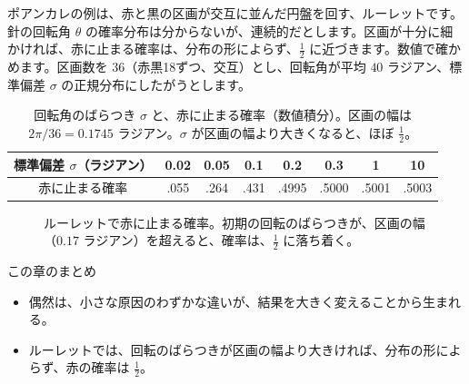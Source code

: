 \documentclass[a4paper,11pt,openany]{ltjsbook}
\begin{document}
ポアンカレの例は、赤と黒の区画が交互に並んだ円盤を回す、ルーレットです。針の回転角 $\theta$ の確率分布は分からないが、連続的だとします。区画が十分に細かければ、赤に止まる確率は、分布の形によらず、$\tfrac12$ に近づきます。数値で確かめます。区画数を $36$（赤黒18ずつ、交互）とし、回転角が平均 $40$ ラジアン、標準偏差 $\sigma$ の正規分布にしたがうとします。

\begin{table}[htbp]
\centering
\begin{tabular}{c|ccccccc}
\toprule
標準偏差 $\sigma$（ラジアン） & 0.02 & 0.05 & 0.1 & 0.2 & 0.3 & 1 & 10\\
\midrule
赤に止まる確率 & .055 & .264 & .431 & .4995 & .5000 & .5001 & .5003\\
\bottomrule
\end{tabular}
\caption{回転角のばらつき $\sigma$ と、赤に止まる確率（数値積分）。区画の幅は $2\pi/36=0.1745$ ラジアン。$\sigma$ が区画の幅より大きくなると、ほぼ $\tfrac12$。}
\end{table}

\begin{figure}[htbp]
\centering
{}
\caption{ルーレットで赤に止まる確率。初期の回転のばらつきが、区画の幅（$0.17$ ラジアン）を超えると、確率は、$\tfrac12$ に落ち着く。}
\end{figure}

\begin{pointbox}{この章のまとめ}
\begin{itemize}[leftmargin=*]
\item 偶然は、小さな原因のわずかな違いが、結果を大きく変えることから生まれる。
\item ルーレットでは、回転のばらつきが区画の幅より大きければ、分布の形によらず、赤の確率は $\tfrac12$。
\end{itemize}
\end{pointbox}
\end{document}
